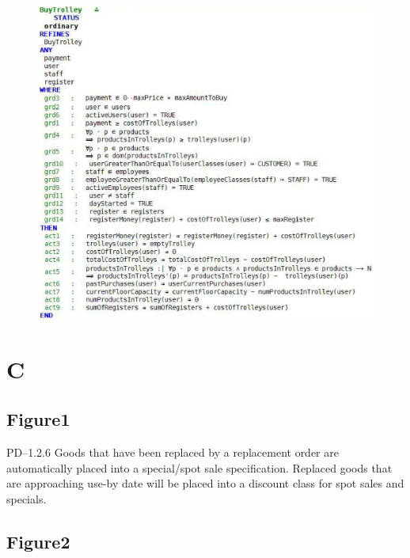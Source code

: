 \begin{figure}[htbp]
\centering
\includegraphics[keepaspectratio,width=\textwidth,height=0.75\textheight]{3.jpg}
\label{}
\end{figure}


 \pagebreak 

\section{C}
\label{c}

\subsection{Figure1}
\label{figure1}

PD--1.2.6 Goods that have been replaced by a replacement order are automatically placed into a special\slash spot sale specification.
Replaced goods that are approaching use-by date will be placed into a discount class for spot sales and specials.

\subsection{Figure2}
\label{figure2}

